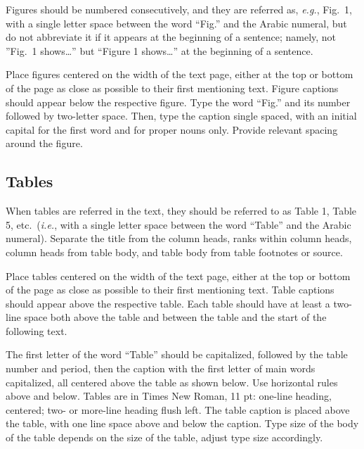 \documentclass[upint,varvw]{prtec}
\begin{document}
Figures should be numbered consecutively, and they are referred as, \textit{e.g.}, Fig.\ 1, with a single letter space between the word ``Fig.'' and the Arabic numeral, but do not abbreviate it if it appears at the beginning of a sentence; namely, not ''Fig.\ 1 shows\ldots '' but ``Figure 1 shows\ldots'' at the beginning of a sentence. 

Place figures centered on the width of the text page, either at the top or bottom of the page as close as possible to their first mentioning text. Figure captions should appear below the respective figure. Type the word ``Fig.'' and its number followed by two-letter space. Then, type the caption single spaced, with an initial capital for the first word and for proper nouns only. Provide relevant spacing around the figure.

\subsection{Tables} When tables are referred in the text, they should be referred to as Table 1, Table 5, etc.\ (\textit{i.e.}, with a single letter space between the word ``Table'' and the Arabic numeral). Separate the title from the column heads, ranks within column heads, column heads from table body, and table body from table footnotes or source. 

Place tables centered on the width of the text page, either at the top or bottom of the page as close as possible to their first mentioning text. Table captions should appear above the respective table.  Each table should have at least a two-line space both above the table and between the table and the start of the following text. 

The first  letter of the word ``Table'' should be capitalized, followed by the table number and period, then the caption with the first letter of main words capitalized, all centered above the table as shown below. Use horizontal rules above and below. Tables are in Times New Roman, 11 pt: one-line heading, centered; two- or more-line heading flush left. The table caption is placed above the table, with one line space above and below the caption. Type size of the body of the table depends on the size of the table, adjust type size accordingly.


\begin{table}[tb]
\caption{\label{tab:1} The table caption is above the table. Captions that are two or more lines are flushed left, one line space above and below the caption.}
\end{table}
\end{document}
